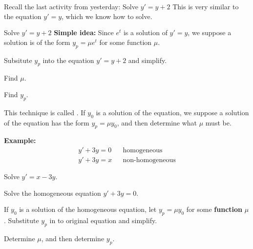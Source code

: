 
\begin{applicationActivities}

\begin{observation}
Recall the last activity from yesterday:
\vfill
Solve \(y'=y+2\)
\vfill
This is very similar to the equation \(y'=y\), which we know how to solve.
\end{observation}

\begin{activity}{15}
Solve \(y'=y+2\)
\vfill
\textbf{Simple idea:} Since \(e^t\) is a solution of \(y'=y\), we suppose a solution is of the form \(y_p = \mu e^t\) for some function \(\mu\). 
\begin{subactivity}
Subsitute \(y_p\) into the equation \(y'=y+2\) and simplify.
\end{subactivity}
\begin{subactivity}
Find \(\mu\).
\end{subactivity}
\begin{subactivity}
Find \(y_p\).
\end{subactivity}
\end{activity}

\begin{observation}
This technique is called .  If \(y_0\) is a solution of the  equation, we suppose a solution of the  equation has the form \(y_p = \mu y_0\), and then determine what \(\mu\) must be. 

\vfill

\textbf{Example: }
\begin{align*}
y'+3y = 0 & & \text{homogeneous} \\
y'+3y = x & & \text{non-homogeneous}
\end{align*}
\end{observation}

\begin{activity}{20}
Solve \(y'=x-3y\).
\begin{subactivity}
Solve the homogeneous equation \(y'+3y=0\).
\end{subactivity}
\begin{subactivity}
If \(y_0\) is a solution of the homogeneous equation, let \(y_p = \mu y_0 \) for some \textbf{function} \(\mu\).
Substitute \(y_p\) in to original equation and simplify.
\end{subactivity}
\begin{subactivity}
Determine \(\mu\), and then determine \(y_p\).
\end{subactivity}
\end{activity}


\end{applicationActivities}

